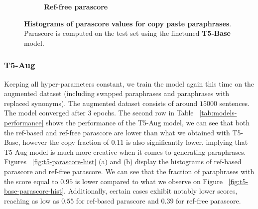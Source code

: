 \documentclass[fleqn,moreauthors,10pt]{ds_report}
\begin{document}
\begin{figure}[ht]
\begin{subfigure}{0.45\linewidth}
        \caption{\textbf{Ref-free parascore}}
        \label{fig:t5-aug-parascore-ref-free-hist}
    \end{subfigure}
    \caption{\textbf{Histograms of parascore values for copy paste paraphrases}. Parascore is computed on the test set using the finetuned \textbf{T5-Base} model.}
    \label{fig:t5-copy-paste-hist}
\end{figure}


\subsubsection{T5-Aug}

Keeping all hyper-parameters constant, we train the model again this time on the augmented dataset (including swapped paraphrases and paraphrases with replaced synonyms). The augmented dataset consists of around $15000$ sentences. The model converged after $3$ epochs. The second row in Table ~\ref{tab:models-performance} shows the performance of the T5-Aug model, we can see that both the ref-based and ref-free parascore are lower than what we obtained with T5-Base, however the copy fraction of $0.11$ is also significantly lower, implying that T5-Aug model is much more creative when it comes to generating paraphrases. Figures ~\ref{fig:t5-parascore-hist} (a) and (b) display the histograms of ref-based parascore and ref-free parascore. We can see that the fraction of paraphrases with the score equal to $0.95$ is lower compared to what we observe on Figure ~\ref{fig:t5-base-parascore-hist}. Additionally, certain cases exhibit notably lower scores, reaching as low as $0.55$ for ref-based parascore and $0.39$ for ref-free parascore.
\end{document}
